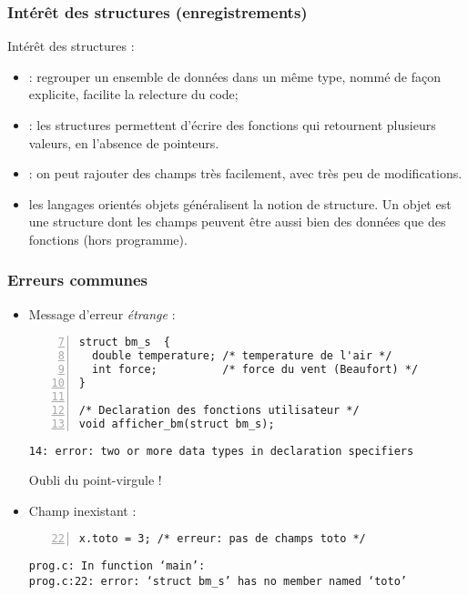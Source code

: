 \documentclass[xcolor=pdftex,svgnames,table]{beamer}
\begin{document}
\begin{frame}
  \frametitle{Intérêt des structures (enregistrements)}

Intérêt des structures  :
  \begin{itemize}
   \item {} : regrouper un ensemble
      de données dans un même type, nommé de façon explicite,
      facilite la relecture du code;\pause
  \item {} : les structures permettent d'écrire des
    fonctions qui retournent plusieurs valeurs, en l'absence de pointeurs.\pause
    \item {} : on peut rajouter des champs très
      facilement, avec très peu de modifications.\pause
    \item {} les langages orientés objets
      généralisent la notion de structure. Un objet est une structure
      dont les champs peuvent être aussi bien des données que des
      fonctions (hors programme).
  \end{itemize}
\end{frame}

\begin{frame}[fragile]
  \frametitle{Erreurs communes}

\begin{itemize}
\item Message d'erreur \emph{étrange} :
\begin{lstlisting}[numbers=left,basicstyle=\ttfamily\small,firstnumber=7] 
struct bm_s  {
  double temperature; /* temperature de l'air */
  int force;          /* force du vent (Beaufort) */
}

/* Declaration des fonctions utilisateur */
void afficher_bm(struct bm_s);
\end{lstlisting}
{\small
\begin{verbatim}
14: error: two or more data types in declaration specifiers
\end{verbatim}
}
\pause
\alert{Oubli du point-virgule !}
\pause
\item Champ inexistant :
\begin{lstlisting}[numbers=left,basicstyle=\ttfamily\small,firstnumber=22] 
  x.toto = 3; /* erreur: pas de champs toto */
\end{lstlisting}
{\small
\begin{verbatim}
prog.c: In function ‘main’:
prog.c:22: error: ‘struct bm_s’ has no member named ‘toto’
\end{verbatim}
}
\end{itemize}
\end{frame}
\end{document}
